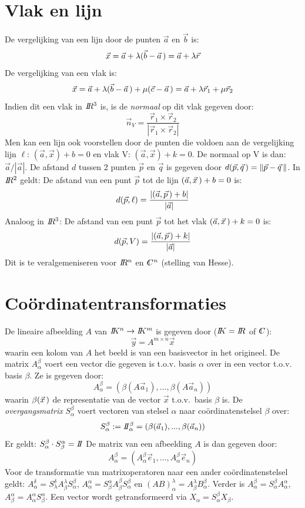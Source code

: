 \documentclass[twoside]{report}
\begin{document}
\section{Vlak en lijn}
De vergelijking van een lijn door de punten $\vec{a}$ en $\vec{b}$ is:
\[
\vec{x}=\vec{a}+\lambda(\vec{b}-\vec{a}\,)=\vec{a}+\lambda\vec{r}
\]
De vergelijking van een vlak is:
\[
\vec{x}=\vec{a}+\lambda(\vec{b}-\vec{a}\,)+\mu(\vec{c}-\vec{a}\,)=\vec{a}+\lambda\vec{r}_1+\mu\vec{r}_2
\]
Indien dit een vlak in $I\hspace{-1mm}R^3$ is, is de {\it normaal} op dit vlak gegeven
door:
\[
\vec{n}_V=\frac{\vec{r}_1\times\vec{r}_2}{|\vec{r}_1\times\vec{r}_2|}
\]
Men kan een lijn ook voorstellen door de punten die voldoen aan de vergelijking
lijn $\ell$: $(\vec{a},\vec{x})+b=0$ en vlak V: $(\vec{a},\vec{x})+k=0$.
De normaal op V is dan: $\vec{a}/|\vec{a}|$.
\npar
De afstand $d$ tussen 2 punten $\vec{p}$ en $\vec{q}$ is gegeven door
$d(\vec{p},\vec{q}\,)=\|\vec{p}-\vec{q}\,\|$.
\npar
In $I\hspace{-1mm}R^2$ geldt:
De afstand van een punt $\vec{p}$ tot de lijn $(\vec{a},\vec{x}\,)+b=0$ is:
\[
d(\vec{p},\ell)=\frac{|(\vec{a},\vec{p}\,)+b|}{|\vec{a}|}
\]
Analoog in $I\hspace{-1mm}R^3$:
De afstand van een punt $\vec{p}$ tot het vlak $(\vec{a},\vec{x}\,)+k=0$ is:
\[
d(\vec{p},V)=\frac{|(\vec{a},\vec{p}\,)+k|}{|\vec{a}|}
\]
Dit is te veralgemeniseren voor $I\hspace{-1mm}R^n$ en $\CC^n$ (stelling van Hesse).

\section{Co\"ordinatentransformaties}
De lineaire afbeelding $A$ van $I\hspace{-1mm}K^n\rightarrow I\hspace{-1mm}K^m$ is gegeven door
($I\hspace{-1mm}K=I\hspace{-1mm}R$ of $\CC$):
\[
\vec{y}=A^{m\times n}\vec{x}
\]
waarin een kolom van $A$ het beeld is van een basisvector in het origineel.
\npar
De matrix $A_\alpha^\beta$ voert een vector die gegeven is t.o.v. basis
$\alpha$ over in een vector t.o.v. basis $\beta$. Ze is gegeven door:
\[
A_\alpha^\beta=\left(\beta(A\vec{a}_1),...,\beta(A\vec{a}_n)\right)
\]
waarin $\beta(\vec{x}\,)$ de representatie van de vector $\vec{x}$
t.o.v.\ basis $\beta$ is.
\npar
De {\it overgangsmatrix} $S_\alpha^\beta$ voert vectoren van stelsel $\alpha$
naar co\"ordinatenstelsel $\beta$ over:
\[
S_\alpha^\beta:=I\hspace{-1mm}I_\alpha^\beta=\left(\beta(\vec{a}_1),...,\beta(\vec{a}_n)\right)
\]
Er geldt: $S_\alpha^\beta\cdot S_\beta^\alpha=I\hspace{-1mm}I$
\npar
De matrix van een afbeelding $A$ is dan gegeven door:
\[
A_\alpha^\beta=\left(A_\alpha^\beta\vec{e}_1,...,A_\alpha^\beta\vec{e}_n\right)
\]
Voor de transformatie van matrixoperatoren naar een ander co\"ordinatenstelsel
geldt: $A_\alpha^\delta=S_\lambda^\delta A_\beta^\lambda S_\alpha^\beta$,
$A_\alpha^\alpha=S_\beta^\alpha A_\beta^\beta S_\alpha^\beta$ en
$(AB)_\alpha^\lambda=A_\beta^\lambda B_\alpha^\beta$.
\npar
Verder is $A_\alpha^\beta=S_\alpha^\beta A_\alpha^\alpha$,
$A_\beta^\alpha=A_\alpha^\alpha S_\beta^\alpha$. Een vector wordt
getransformeerd via $X_\alpha=S_\alpha^\beta X_\beta$.
\end{document}
